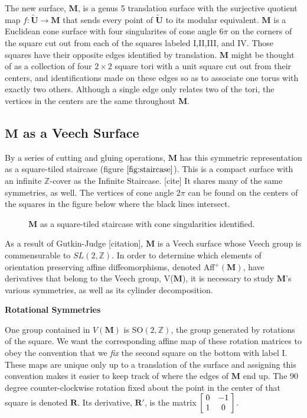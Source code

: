 \documentclass[]{article}
\begin{document}
The new surface, $\mathbf M$, is a genus 5 translation surface with the surjective quotient map $f:\tilde{\mathbf{U}}\rightarrow\mathbf M$ that sends every point of $\tilde{\mathbf{U}}$ to its modular equivalent. $\mathbf M$ is a Euclidean cone surface with four singularites of cone angle $6\pi$ on the corners of the square cut out from each of the squares labeled I,II,III, and IV. Those squares have their opposite edges identified by translation. $\mathbf M$ might be thought of as a collection of four $2\times2$ square tori with a unit square cut out from their centers, and identifications made on these edges so as to associate one torus with exactly two others. Although a single edge only relates two of the tori, the vertices in the centers are the same throughout $\mathbf M$.
\newpage

\subsection{$\mathbf M$ as a Veech Surface}
By a series of cutting and gluing operations, $\mathbf M$ has this symmetric representation as a square-tiled staircase (figure $\ref{fig:staircase}$). This is a compact surface with an infinite $\mathbb Z$-cover as the Infinite Staircase. [cite] It shares many of the same symmetries, as well. The vertices of cone angle $2\pi$ can be found on the centers of the squares in the figure below where the black lines intersect. 
\begin{figure}[H]
\centering

\caption{$\mathbf{M}$ as a square-tiled staircase with cone singularities identified.}
\label{fig:staircase}
\end{figure}
As a result of Gutkin-Judge [citation], $\mathbf M$ is a Veech surface whose Veech group is commensurable to $SL(2,\mathbb Z)$. In order to determine which elements of orientation preserving affine diffeomorphisms, denoted Aff$^{+}(\mathbf M)$, have derivatives that belong to the Veech group, V($\mathbf M$), it is necessary to study $\mathbf M$'s various symmetries, as well as its cylinder decomposition.
\vspace{0.1in}

\noindent\textbf{Rotational Symmetries}

One group contained in $V(\mathbf M)$ is SO$(2,\mathbb{Z})$, the group generated by rotations of the square. We want the corresponding affine map of these rotation matrices to obey the convention that we \emph{fix} the second square on the bottom with label I. These maps are unique only up to a translation of the surface and assigning this convention makes it easier to keep track of where the edges of $\mathbf M$ end up. The 90 degree counter-clockwise rotation fixed about the point in the center of that square is denoted $\mathbf{R}$. Its derivative, $\mathbf{R}'$, is the matrix $\left[ \hspace{1mm} \begin{matrix}
							0 & -1\\
							1 & 0
						\end{matrix}\hspace{1mm}\right]$.
\end{document}
